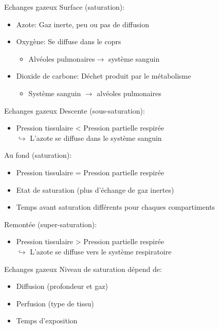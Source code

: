 \begin{frame}{Echanges gazeux}  
	Surface (saturation):
	\begin{itemize}
		\item Azote: Gaz inerte, peu ou pas de diffusion
		\item Oxygène: Se diffuse dans le coprs
		\begin{itemize}
			\item  Alvéoles pulmonaires$\rightarrow$  système sanguin
		\end{itemize}
		\item Dioxide de carbone: Déchet produit par le métabolisme
		\begin{itemize}
			\item Système sanguin $\rightarrow$  alvéoles pulmonaires
		\end{itemize}
	\end{itemize}
\end{frame}

\begin{frame}{Echanges gazeux}  
	Descente (sous-saturation):
	\begin{itemize}
		\item Pression tissulaire < Pression partielle respirée\\
				$\hookrightarrow$ L'azote se diffuse dans le système sanguin
	\end{itemize}
	\vfill
	Au fond (saturation):
	\begin{itemize}
		\item Pression tissulaire = Pression partielle respirée
		\item Etat de saturation (plus d'échange de gaz inertes)
		\item Temps avant saturation différents pour chaques compartiments
	\end{itemize}
	\vfill
	Remontée (super-saturation):
	\begin{itemize}
		\item Pression tissulaire > Pression partielle respirée\\
				$\hookrightarrow$ L'azote se diffuse vers le système respiratoire
	\end{itemize}
\end{frame}

\begin{frame}{Echanges gazeux}  
	Niveau de saturation dépend de:
	\begin{itemize}
		\item Diffusion (profondeur et gaz)
		\item Perfusion (type de tissu)
		\item Temps d'exposition
	\end{itemize}
\end{frame}

